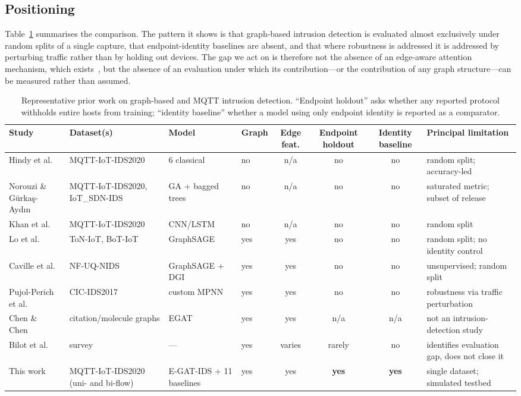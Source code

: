 \subsection{Positioning}

Table~\ref{tab:related} summarises the comparison. The pattern it shows is
that graph-based intrusion detection is evaluated almost exclusively under
random splits of a single capture, that endpoint-identity baselines are absent,
and that where robustness is addressed it is addressed by perturbing traffic
rather than by holding out devices. The gap we act on is therefore not the
absence of an edge-aware attention mechanism, which
exists~\cite{chen2021egat}, but the absence of an evaluation under which its
contribution---or the contribution of any graph structure---can be measured
rather than assumed.

\begin{table}[!t]
\caption{Representative prior work on graph-based and MQTT intrusion
detection. ``Endpoint holdout'' asks whether any reported protocol withholds
entire hosts from training; ``identity baseline'' whether a model using only
endpoint identity is reported as a comparator.}
\label{tab:related}
\centering
\small
\begin{tabular}{@{}llllcccl@{}}
\toprule
Study & Dataset(s) & Model & Graph & Edge feat. & Endpoint holdout &
Identity baseline & Principal limitation \\
\midrule
Hindy et al.~\cite{hindy2020mqttcase} & MQTT-IoT-IDS2020 & 6 classical & no &
n/a & no & no & random split; accuracy-led \\
Norouzi \& G\"urka\c{s}-Ayd{\i}n~\cite{norouzi2026reliable} & MQTT-IoT-IDS2020,
IoT\_SDN-IDS & GA + bagged trees & no & n/a & no & no &
saturated metric; subset of release \\
Khan et al.~\cite{khan2021mqttdl} & MQTT-IoT-IDS2020 & CNN/LSTM & no & n/a &
no & no & random split \\
Lo et al.~\cite{lo2022egraphsage} & ToN-IoT, BoT-IoT & GraphSAGE & yes & yes &
no & no & random split; no identity control \\
Caville et al.~\cite{caville2022anomale} & NF-UQ-NIDS & GraphSAGE + DGI &
yes & yes & no & no & unsupervised; random split \\
Pujol-Perich et al.~\cite{pujolperich2022unveiling} & CIC-IDS2017 & custom MPNN
& yes & yes & no & no & robustness via traffic perturbation \\
Chen \& Chen~\cite{chen2021egat} & citation/molecule graphs & EGAT & yes & yes
& n/a & n/a & not an intrusion-detection study \\
Bilot et al.~\cite{bilot2024survey} & survey & --- & yes & varies & rarely &
no & identifies evaluation gap, does not close it \\
\midrule
This work & MQTT-IoT-IDS2020 (uni- and bi-flow) & E-GAT-IDS + 11 baselines &
yes & yes & \textbf{yes} & \textbf{yes} & single dataset; simulated testbed \\
\bottomrule
\end{tabular}
\end{table}

